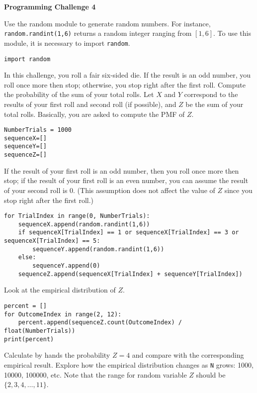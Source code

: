 \documentclass[11pt]{article}
\begin{document}
\begin{center}
{\bfseries \LARGE Programming Challenge 4}
\end{center}

Use the random module to generate random numbers.
For instance, \texttt{random.randint(1,6)} returns a random integer ranging from $[1,6]$.
To use this module, it is necessary to import \texttt{random}.
\begin{verbatim}
import random
\end{verbatim}

In this challenge, you roll a fair six-sided die.
If the result is an odd number, you roll once more then stop; otherwise, you stop right after the first roll.
Compute the probability of the sum of your total rolls.
Let $X$ and $Y$ correspond to the results of your first roll and second roll (if possible), and $Z$ be the sum of your total rolls.
Basically, you are asked to compute the PMF of $Z$.

\begin{verbatim}
NumberTrials = 1000
sequenceX=[]
sequenceY=[]
sequenceZ=[]
\end{verbatim}

If the result of your first roll is an odd number, then you roll once more then stop; if the result of your first roll is an even number, you can assume the result of your second roll is $0$.
(This assumption does not affect the value of $Z$ since you stop right after the first roll.)
\begin{verbatim}
for TrialIndex in range(0, NumberTrials):
    sequenceX.append(random.randint(1,6))
    if sequenceX[TrialIndex] == 1 or sequenceX[TrialIndex] == 3 or sequenceX[TrialIndex] == 5:
        sequenceY.append(random.randint(1,6))
    else:
        sequenceY.append(0)
    sequenceZ.append(sequenceX[TrialIndex] + sequenceY[TrialIndex])
\end{verbatim}

Look at the empirical distribution of $Z$. 
\begin{verbatim}
percent = []
for OutcomeIndex in range(2, 12):
    percent.append(sequenceZ.count(OutcomeIndex) / float(NumberTrials))
print(percent)
\end{verbatim}
 Calculate by hands the probability $Z=4$ and compare with the corresponding empirical result.
Explore how the empirical distribution changes as \texttt{N} grows: 1000, 10000, 100000, etc.
Note that the range for random variable $Z$ should be $\{2, 3, 4, \ldots, 11\}$.
\end{document}
